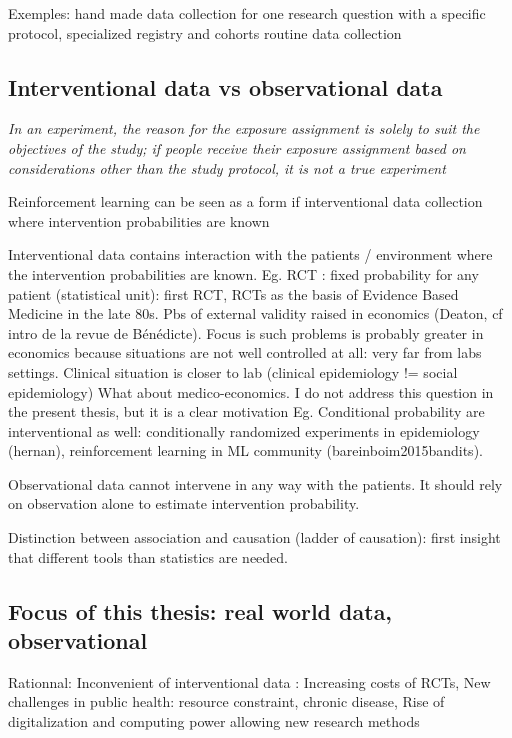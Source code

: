 \documentclass{report}
\begin{document}
Exemples:
hand made data collection for one research question with a specific protocol,
specialized registry and cohorts
routine data collection


\subsection{Interventional data vs observational data}\label{subsec:intro:interventional_vs_observational}


\textit{In an experiment, the reason for the exposure assignment is solely to
  suit the objectives of the study; if people receive their exposure assignment
  based on considerations other than the study protocol, it is not a true
  experiment} \citep{rothman2012epidemiology}

Reinforcement learning can be seen as a form if
interventional data collection where intervention probabilities are known
\cite{bareinboim2015bandits}


Interventional data contains interaction with the patients / environment where the intervention probabilities are known.
Eg. RCT : fixed probability for any patient (statistical unit): first RCT, RCTs as the basis of Evidence Based Medicine in the late 80s.
Pbs of external validity raised in economics (Deaton, cf intro de la revue de Bénédicte). Focus is such problems is probably greater in economics because situations are not well controlled at all: very far from labs settings. Clinical situation is closer to lab (clinical epidemiology != social epidemiology)
What about medico-economics. I do not address this question in the present thesis, but it is a clear motivation
Eg. Conditional probability are interventional as well: conditionally randomized experiments in epidemiology (hernan), reinforcement learning in ML community (bareinboim2015bandits).

Observational data cannot intervene in any way with the patients. It should rely on observation alone to estimate intervention probability.

Distinction between association and causation (ladder of causation): first insight that different tools than statistics are needed.

\subsection{Focus of this thesis: real world data, observational}\label{subsec:intro:focus_data}

Rationnal:
Inconvenient of interventional data : Increasing costs of RCTs,
New challenges in public health: resource constraint, chronic disease,
Rise of digitalization and computing power allowing new research methods
\end{document}
